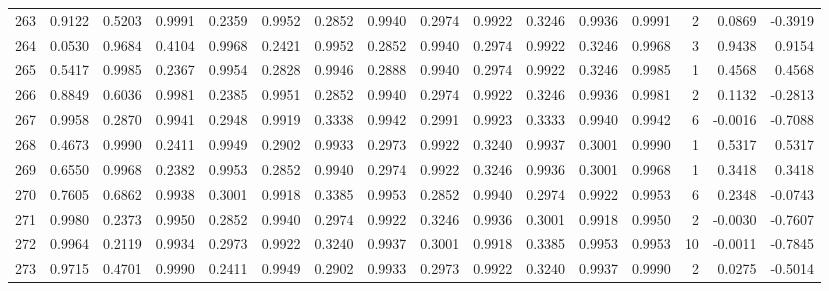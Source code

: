 \begin{tabular}{lrrrrrrrrrrrrrrr}
263 &      0.9122 &  0.5203 &  0.9991 &  0.2359 &  0.9952 &  0.2852 &  0.9940 &  0.2974 &  0.9922 &  0.3246 &   0.9936 &     0.9991 &      2 &                    0.0869 &                    -0.3919 \\
264 &      0.0530 &  0.9684 &  0.4104 &  0.9968 &  0.2421 &  0.9952 &  0.2852 &  0.9940 &  0.2974 &  0.9922 &   0.3246 &     0.9968 &      3 &                    0.9438 &                     0.9154 \\
265 &      0.5417 &  0.9985 &  0.2367 &  0.9954 &  0.2828 &  0.9946 &  0.2888 &  0.9940 &  0.2974 &  0.9922 &   0.3246 &     0.9985 &      1 &                    0.4568 &                     0.4568 \\
266 &      0.8849 &  0.6036 &  0.9981 &  0.2385 &  0.9951 &  0.2852 &  0.9940 &  0.2974 &  0.9922 &  0.3246 &   0.9936 &     0.9981 &      2 &                    0.1132 &                    -0.2813 \\
267 &      0.9958 &  0.2870 &  0.9941 &  0.2948 &  0.9919 &  0.3338 &  0.9942 &  0.2991 &  0.9923 &  0.3333 &   0.9940 &     0.9942 &      6 &                   -0.0016 &                    -0.7088 \\
268 &      0.4673 &  0.9990 &  0.2411 &  0.9949 &  0.2902 &  0.9933 &  0.2973 &  0.9922 &  0.3240 &  0.9937 &   0.3001 &     0.9990 &      1 &                    0.5317 &                     0.5317 \\
269 &      0.6550 &  0.9968 &  0.2382 &  0.9953 &  0.2852 &  0.9940 &  0.2974 &  0.9922 &  0.3246 &  0.9936 &   0.3001 &     0.9968 &      1 &                    0.3418 &                     0.3418 \\
270 &      0.7605 &  0.6862 &  0.9938 &  0.3001 &  0.9918 &  0.3385 &  0.9953 &  0.2852 &  0.9940 &  0.2974 &   0.9922 &     0.9953 &      6 &                    0.2348 &                    -0.0743 \\
271 &      0.9980 &  0.2373 &  0.9950 &  0.2852 &  0.9940 &  0.2974 &  0.9922 &  0.3246 &  0.9936 &  0.3001 &   0.9918 &     0.9950 &      2 &                   -0.0030 &                    -0.7607 \\
272 &      0.9964 &  0.2119 &  0.9934 &  0.2973 &  0.9922 &  0.3240 &  0.9937 &  0.3001 &  0.9918 &  0.3385 &   0.9953 &     0.9953 &     10 &                   -0.0011 &                    -0.7845 \\
273 &      0.9715 &  0.4701 &  0.9990 &  0.2411 &  0.9949 &  0.2902 &  0.9933 &  0.2973 &  0.9922 &  0.3240 &   0.9937 &     0.9990 &      2 &                    0.0275 &                    -0.5014 \\

\end{tabular}
